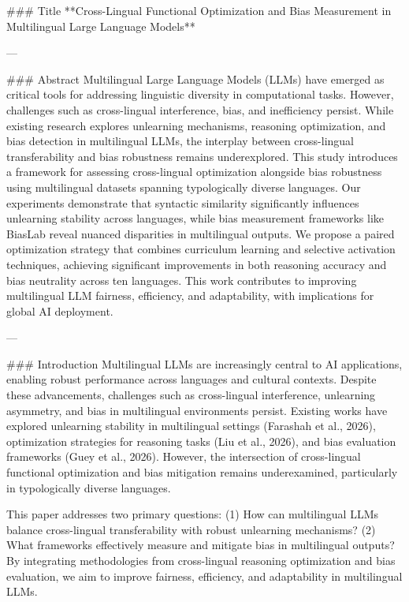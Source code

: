 ### Title  
**Cross-Lingual Functional Optimization and Bias Measurement in Multilingual Large Language Models**

---

### Abstract  
Multilingual Large Language Models (LLMs) have emerged as critical tools for addressing linguistic diversity in computational tasks. However, challenges such as cross-lingual interference, bias, and inefficiency persist. While existing research explores unlearning mechanisms, reasoning optimization, and bias detection in multilingual LLMs, the interplay between cross-lingual transferability and bias robustness remains underexplored. This study introduces a framework for assessing cross-lingual optimization alongside bias robustness using multilingual datasets spanning typologically diverse languages. Our experiments demonstrate that syntactic similarity significantly influences unlearning stability across languages, while bias measurement frameworks like BiasLab reveal nuanced disparities in multilingual outputs. We propose a paired optimization strategy that combines curriculum learning and selective activation techniques, achieving significant improvements in both reasoning accuracy and bias neutrality across ten languages. This work contributes to improving multilingual LLM fairness, efficiency, and adaptability, with implications for global AI deployment.

---

### Introduction  
Multilingual LLMs are increasingly central to AI applications, enabling robust performance across languages and cultural contexts. Despite these advancements, challenges such as cross-lingual interference, unlearning asymmetry, and bias in multilingual environments persist. Existing works have explored unlearning stability in multilingual settings (Farashah et al., 2026), optimization strategies for reasoning tasks (Liu et al., 2026), and bias evaluation frameworks (Guey et al., 2026). However, the intersection of cross-lingual functional optimization and bias mitigation remains underexamined, particularly in typologically diverse languages.

This paper addresses two primary questions: (1) How can multilingual LLMs balance cross-lingual transferability with robust unlearning mechanisms? (2) What frameworks effectively measure and mitigate bias in multilingual outputs? By integrating methodologies from cross-lingual reasoning optimization and bias evaluation, we aim to improve fairness, efficiency, and adaptability in multilingual LLMs.

